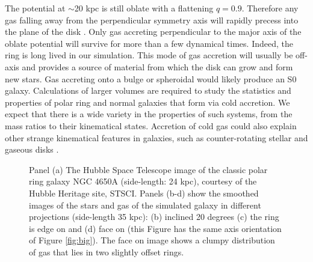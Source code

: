 \documentclass[preprint]{aastex}
\begin{document}
The potential at $\sim$20 kpc is still oblate with a flattening $q=0.9$.
Therefore any gas falling away from the perpendicular symmetry axis will rapidly
precess into the plane of the disk \citep{Weinberg02,Muralietal2002}. Only gas accreting
perpendicular to the major axis of the oblate potential will survive for more than a few
dynamical times. Indeed, the ring is long lived in our simulation.
This mode of gas accretion will usually be off-axis and 
provides a source of material from which the disk can grow and form new stars.
Gas accreting onto a bulge or spheroidal would likely produce an S0 galaxy. 
Calculations of larger volumes are required to study the statistics and properties
of polar ring and normal 
galaxies that form via cold accretion. We expect that there is a wide variety
in the properties of such systems, from the mass ratios to their kinematical states. 
Accretion of cold gas could also explain other strange kinematical 
features in galaxies, such as 
counter-rotating stellar and gaseous disks \citep{Merrifield1994,Bertola1996}.


\begin{figure}[t]
\centerline{\epsfxsize=3.2in }
\caption{Panel (a) The Hubble Space Telescope image of the classic
polar ring galaxy NGC 4650A (side-length: 24 kpc), courtesy of the Hubble
Heritage site, STSCI. Panels
(b-d) show the smoothed images of the stars and gas of the simulated galaxy in
different projections (side-length 35 kpc): 
(b) inclined 20 degrees (c) the ring is edge on and (d) face on (this Figure
has the same axis orientation of Figure \ref{fig:big}).
The face on image shows a clumpy distribution of gas that lies in two
slightly offset rings.}
\label{fig:hub}
\end{figure}
%
\end{document}
